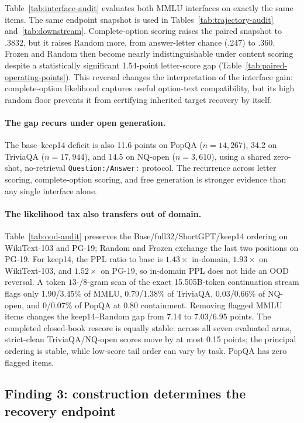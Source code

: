 Table~\ref{tab:interface-audit} evaluates both MMLU interfaces on exactly the
same items. The same endpoint snapshot is used in
Tables~\ref{tab:trajectory-audit} and~\ref{tab:downstream}.
Complete-option scoring raises the paired snapshot to .3832, but it
raises Random more, from answer-letter chance (.247) to .360. Frozen and Random
then become nearly indistinguishable under content scoring despite a
statistically significant 1.54-point letter-score gap
(Table~\ref{tab:paired-operating-points}). This reversal changes the interpretation
of the interface gain: complete-option likelihood captures useful option-text
compatibility, but its high random floor prevents it from certifying inherited
target recovery by itself.

\paragraph{The gap recurs under open generation.}
The base--keep14 deficit is also 11.6 points on PopQA
($n{=}14{,}267$), 34.2 on TriviaQA ($n{=}17{,}944$), and 14.5 on NQ-open
($n{=}3{,}610$), using a shared zero-shot, no-retrieval
\texttt{Question:/Answer:} protocol. The recurrence across letter scoring,
complete-option scoring, and free generation is stronger evidence than any
single interface alone.



\paragraph{The likelihood tax also transfers out of domain.}
Table~\ref{tab:ood-audit} preserves the Base/full32/ShortGPT/keep14 ordering on
WikiText-103 and PG-19; Random and Frozen exchange the last two positions on
PG-19. For keep14, the PPL ratio to base is $1.43\times$ in-domain,
$1.93\times$ on WikiText-103, and $1.52\times$ on PG-19, so in-domain PPL does
not hide an OOD reversal. A token $13$-/$8$-gram scan of the exact 15.505B-token
continuation stream flags only 1.90/3.45\% of MMLU, 0.79/1.38\% of TriviaQA,
0.03/0.66\% of NQ-open, and 0/0.07\% of PopQA at 0.80 containment. Removing
flagged MMLU items changes the keep14--Random gap from 7.14 to 7.03/6.95 points.
The completed closed-book rescore is equally stable: across all seven evaluated
arms, strict-clean TriviaQA/NQ-open scores move by at most 0.15 points; the
principal ordering is stable, while low-score tail order can vary by task.
PopQA has zero flagged items.

\subsection{Finding 3: construction determines the recovery endpoint}


